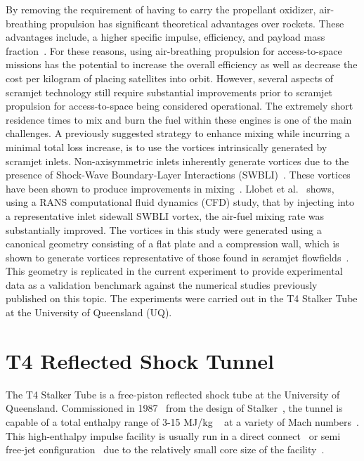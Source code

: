 \documentclass{AIAA}
\begin{document}
By removing the requirement of having to carry the propellant oxidizer, air-breathing propulsion has significant theoretical advantages over rockets.
These advantages include, a higher specific impulse, efficiency, and payload mass fraction~\cite{SmartTetlow,CookHueter}.
For these reasons, using air-breathing propulsion for access-to-space missions has the potential to increase the overall efficiency as well as decrease the cost per kilogram of placing satellites into orbit.
However, several aspects of scramjet technology still require substantial improvements prior to scramjet propulsion for access-to-space being considered operational.
The extremely short residence times to mix and burn the fuel within these engines is one of the main challenges.
A previously suggested strategy to enhance mixing while incurring a minimal total loss increase, is to use the vortices intrinsically generated by scramjet inlets.
Non-axisymmetric inlets inherently generate vortices due to the presence of Shock-Wave Boundary-Layer Interactions (SWBLI)~\cite{Alvi}.
These vortices have been shown to produce improvements in mixing~\cite{SpacePlanes_paper2015,Llobet_PlumeElongation}.
Llobet et al.~\cite{Llobet_PlumeElongation} shows, using a RANS computational fluid dynamics (CFD) study, that by injecting into a representative inlet sidewall SWBLI vortex, the air-fuel mixing rate was substantially improved.
The vortices in this study were generated using a canonical geometry consisting of a flat plate and a compression wall, which is shown to generate vortices representative of those found in scramjet flowfields~\cite{AFMCpaper2014}.
This geometry is replicated in the current experiment to provide experimental data as a validation benchmark against the numerical studies previously published on this topic.
The experiments were carried out in the T4 Stalker Tube at the University of Queensland (UQ).



\section{T4 Reflected Shock Tunnel}
	\label{sec:T4Literature}
	
The T4 Stalker Tube is a free-piston reflected shock tube at the University of Queensland. 
Commissioned in 1987~\cite{Doherty:PhD_Thesis_Scram_M10} from the design of Stalker~\cite{Stalker1966}, the tunnel is capable of a total enthalpy range of 3-15 MJ/kg ~\cite{Doherty:PhD_Thesis_Scram_M10} at a variety of Mach numbers~\cite{Tanimizu:Phd_Thesis}.
This high-enthalpy impulse facility is usually run in a direct connect~\cite{Kirchhartz:PhD_Thesis_Boundary_Combustion, RidingsAndrewNoel2015Iops} or semi free-jet configuration~\cite{Chan:Boundary_Layer_Combustion_Perturbation, Wise_Thesis} due to the relatively small core size of the facility~\cite{Itoh1999, Stalker_2005}.
\end{document}
